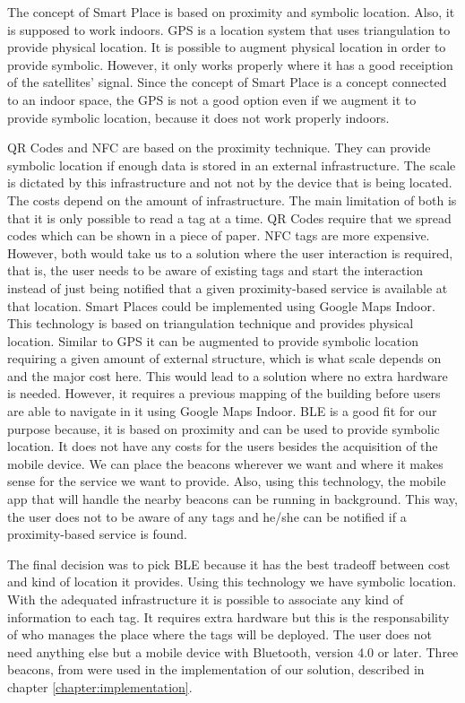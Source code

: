 The concept of Smart Place is based on proximity and symbolic location.
Also, it is supposed to work indoors.
\gls{GPS} is a location system that uses triangulation to provide physical location.
It is possible to augment physical location in order to provide symbolic.
However, it only works properly where it has a good receiption of the satellites' signal.
Since the concept of Smart Place is a concept connected to an indoor space, the \gls{GPS} is not a good option even if we augment it to provide symbolic location, because it does not work properly indoors.

\gls{QR} Codes and \gls{NFC} are based on the proximity technique.
They can provide symbolic location if enough data is stored in an external infrastructure.
The scale is dictated by this infrastructure and not not by the device that is being located.
The costs depend on the amount of infrastructure.
The main limitation of both is that it is only possible to read a tag at a time.
\gls{QR} Codes require that we spread codes which can be shown in a piece of paper.
\gls{NFC} tags are more expensive.
However, both would take us to a solution where the user interaction is required, that is, the user needs to be aware of existing tags and start the interaction instead of just being notified that a given proximity-based service is available at that location.
Smart Places could be implemented using Google Maps Indoor.
This technology is based on triangulation technique and provides physical location.
Similar to \gls{GPS} it can be augmented to provide symbolic location requiring a given amount of external structure, which is what scale depends on and the major cost here.
This would lead to a solution where no extra hardware is needed.
However, it requires a previous mapping of the building before users are able to navigate in it using Google Maps Indoor.
\gls{BLE} is a good fit for our purpose because, it is based on proximity and can be used to provide symbolic location.
It does not have any costs for the users besides the acquisition of the mobile device.
We can place the beacons wherever we want and where it makes sense for the service we want to provide.
Also, using this technology, the mobile app that will handle the nearby beacons can be running in background.
This way, the user does not to be aware of any tags and he/she can be notified if a proximity-based service is found.

The final decision was to pick \gls{BLE} because it has the best tradeoff between cost and kind of location it provides. Using this technology we have symbolic location. With the adequated infrastructure it is possible to associate any kind of information to each tag.
It requires extra hardware but this is the responsability of who manages the place where the tags will be deployed.
The user does not need anything else but a mobile device with Bluetooth, version 4.0 or later.
Three beacons, from  were used in the implementation of our solution, described in chapter \ref{chapter:implementation}.

